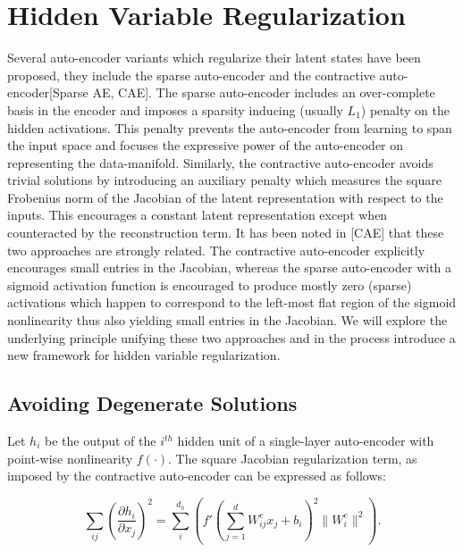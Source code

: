 \documentclass{article} %
\begin{document}
\section{Hidden Variable Regularization}    
Several auto-encoder variants which regularize their latent states have been proposed, they include the sparse auto-encoder and the contractive auto-encoder[Sparse AE, CAE]. The sparse auto-encoder includes an over-complete basis in the encoder and imposes a sparsity inducing (usually $L_1$) penalty on the hidden activations. This penalty prevents the auto-encoder from learning to span the input space and focuses the expressive power of the auto-encoder on representing the data-manifold. Similarly, the contractive auto-encoder avoids trivial solutions by introducing an auxiliary penalty which measures the square  Frobenius norm of the Jacobian of the latent representation with respect to the inputs. This encourages a constant latent representation except when counteracted by the reconstruction term. It has been noted in [CAE] that these two approaches are strongly related. The contractive auto-encoder explicitly encourages small entries in the Jacobian, whereas the sparse auto-encoder with a sigmoid activation function is encouraged to produce mostly zero (sparse) activations which happen to correspond to the left-most flat region of the sigmoid nonlinearity thus also yielding small entries in the Jacobian. We will explore the underlying principle unifying these two approaches and in the process introduce a new framework for hidden variable regularization. 

\subsection{Avoiding Degenerate Solutions} 
Let $h_i$ be the output of the $i^{th}$ hidden unit of a single-layer auto-encoder with point-wise nonlinearity $f(\cdot)$. The square Jacobian regularization term, as imposed by the contractive auto-encoder can be expressed as follows: 

\begin{equation}
\sum_{ij} \left(\frac{\partial h_i}{\partial x_j} \right)^2 = \sum_i ^{d_h} \left(f'(\sum_{j=1}^d W^e_{ij}x_j + b_i)^2 \| W^e_i \| ^2 \right).
\end{equation}  
 
\end{document}
